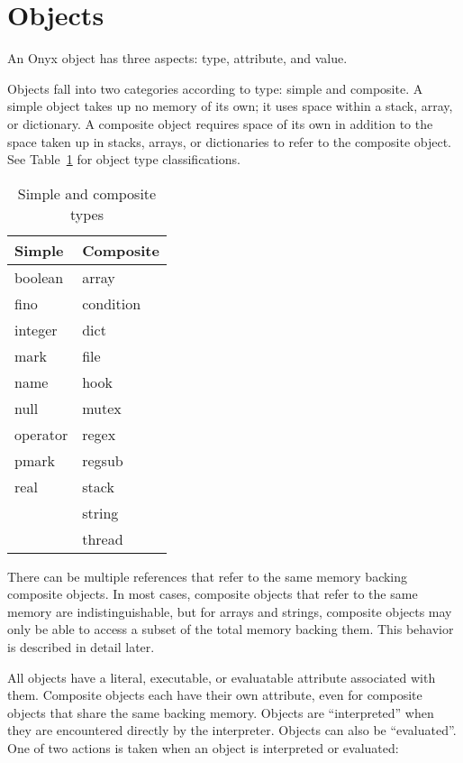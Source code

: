 \section{Objects}
\label{sec:onyx_objects}

An Onyx object has three aspects: type, attribute, and value.

Objects fall into two categories according to type: simple and composite.  A
simple object takes up no memory of its own; it uses space within a stack,
array, or dictionary.  A composite object requires space of its own in addition
to the space taken up in stacks, arrays, or dictionaries to refer to the
composite object.  See Table~\ref{simple-composite} for object type
classifications.

\begin{table}[htb]
\begin{center}
\begin{tabular}{|l|l|}
\hline
Simple	& Composite	\\
\hline \hline
boolean	& array		\\
fino	& condition	\\
integer	& dict		\\
mark	& file		\\
name	& hook		\\
null	& mutex		\\
operator & regex	\\
pmark	& regsub	\\
real	& stack		\\
	& string	\\
	& thread	\\
\hline
\end{tabular}
\end{center}
\caption{\label{simple-composite}
Simple and composite types}
\end{table}

There can be multiple references that refer to the same memory backing composite
objects.  In most cases, composite objects that refer to the same memory are
indistinguishable, but for arrays and strings, composite objects may only be
able to access a subset of the total memory backing them.  This behavior is
described in detail later.

All objects have a literal, executable, or evaluatable attribute associated with
them.  Composite objects each have their own attribute, even for composite
objects that share the same backing memory.  Objects are ``interpreted'' when
they are encountered directly by the interpreter.  Objects can also be
``evaluated''.  One of two actions is taken when an object is interpreted or
evaluated:

